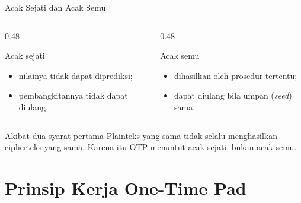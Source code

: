 \documentclass[aspectratio=169,11pt]{beamer}
\begin{document}
\begin{frame}{Acak Sejati dan Acak Semu}
    \begin{columns}[T,onlytextwidth]
        \begin{column}{0.48\textwidth}
            \begin{block}{Acak sejati}
                \footnotesize
                \begin{itemize}
                    \item nilainya tidak dapat diprediksi;
                    \item pembangkitannya tidak dapat diulang.
                \end{itemize}
            \end{block}
        \end{column}
        \begin{column}{0.48\textwidth}
            \begin{block}{Acak semu}
                \footnotesize
                \begin{itemize}
                    \item dihasilkan oleh prosedur tertentu;
                    \item dapat diulang bila umpan (\textit{seed}) sama.
                \end{itemize}
            \end{block}
        \end{column}
    \end{columns}
    \vspace{0.15cm}
    \begin{exampleblock}{Akibat dua syarat pertama}
        Plainteks yang sama tidak selalu menghasilkan cipherteks yang sama.
        Karena itu OTP menuntut acak sejati, bukan acak semu.
    \end{exampleblock}
\end{frame}

\section{Prinsip Kerja One-Time Pad}
\end{document}
